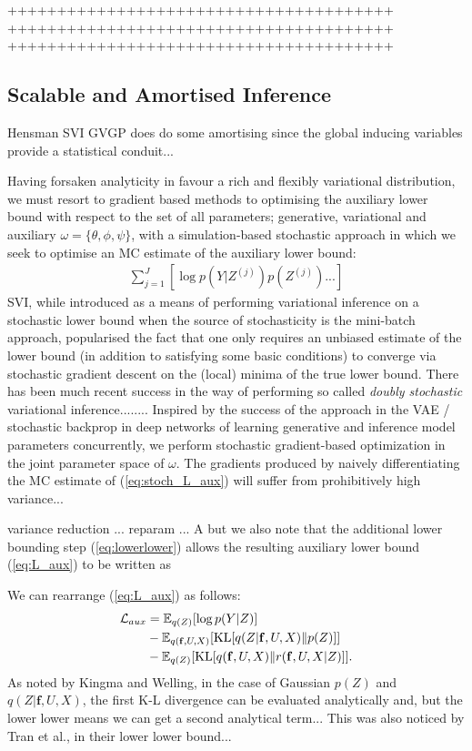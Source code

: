 \documentclass[]{article}
\newcommand{\fb}{\mathbf{f}}
\newcommand{\Ex}{\mathbb{E}}
\newcommand{\KL}{\mathrm{KL}}
\begin{document}
+++++++++++++++++++++++++++++++++++++++
+++++++++++++++++++++++++++++++++++++++
+++++++++++++++++++++++++++++++++++++++

\subsection{Scalable and Amortised Inference}\label{subsec:scale}

Hensman SVI GVGP does do some amortising since the global inducing variables provide a statistical conduit...

Having forsaken analyticity in favour a rich and flexibly variational distribution, we must resort to gradient based methods to optimising the auxiliary lower bound with respect to the set of all parameters; generative, variational and auxiliary $\omega=\{\theta,\phi,\psi\}$, with a simulation-based stochastic approach in which we seek to optimise an MC estimate of the auxiliary lower bound:
%
\begin{align}
  \sum_{j=1}^J [\log p(Y|Z^{(j)})p(Z^{(j)})...]\label{eq:stoch_L_aux}
\end{align}
%
SVI, while introduced as a means of performing variational inference on a stochastic lower bound when the source of stochasticity is the mini-batch approach, popularised the fact that one only requires an unbiased estimate of the lower bound (in addition to satisfying some basic conditions) to converge via stochastic gradient descent on the (local) minima of the true lower bound.
There has been much recent success in the way of performing so called \emph{doubly stochastic} variational inference........
Inspired by the success of the approach in the VAE / stochastic backprop in deep networks of learning generative and inference model parameters concurrently, we perform stochastic gradient-based optimization in the joint parameter space of $\omega$.
The gradients produced by naively differentiating the MC estimate of (\ref{eq:stoch_L_aux}) will suffer from prohibitively high variance...

variance reduction ... reparam ... A but we also note that the additional lower bounding step (\ref{eq:lowerlower}) allows the resulting auxiliary lower bound (\ref{eq:L_aux}) to be written as

We can rearrange (\ref{eq:L_aux}) as follows:
%
\begin{align}
\mathcal{L}_{aux} &= \Ex_{q(Z)}[ \log p(Y|Z) ] \notag \\
&- \Ex_{q(\fb,U,X)}[ \KL[q(Z|\fb,U,X)\Vert p(Z)] ]\notag\\
&- \Ex_{q(Z)}[ \KL[q(\fb,U,X)\Vert r(\fb,U,X|Z)] ].\label{eq:L_aux_ABC}
\end{align}
%
As noted by Kingma and Welling, in the case of Gaussian $p(Z)$ and $q(Z|\fb,U,X)$, the first K-L divergence can be evaluated analytically and, but the lower lower means we can get a second analytical term...
This was also noticed by Tran et al., in their lower lower bound...
\end{document}
